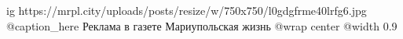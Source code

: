  
 
 
 
 

\ifcmt
  ig https://mrpl.city/uploads/posts/resize/w/750x750/l0gdgfrme40lrfg6.jpg
	@caption_here Реклама в газете Мариупольская жизнь 
  @wrap center
  @width 0.9
\fi
